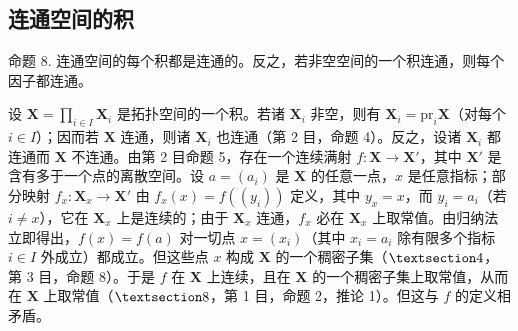 \subsection{连通空间的积}

命题 8. 连通空间的每个积都是连通的。反之，若非空空间的一个积连通，则每个因子都连通。

设 \(\mathbf{X} = \prod_{i \in I} \mathbf{X}_i\) 是拓扑空间的一个积。若诸 \(\mathbf{X}_i\) 非空，则有 \(\mathbf{X}_i = \text{pr}_i\mathbf{X}\)（对每个 \(i \in I\)）；因而若 \(\mathbf{X}\) 连通，则诸 \(\mathbf{X}_i\) 也连通（第 2 目，命题 4）。反之，设诸 \(\mathbf{X}_i\) 都连通而 \(\mathbf{X}\) 不连通。由第 2 目命题 5，存在一个连续满射 \(f: \mathbf{X} \to \mathbf{X}'\)，其中 \(\mathbf{X}'\) 是含有多于一个点的离散空间。设 \(a = (a_i)\) 是 \(\mathbf{X}\) 的任意一点，\(x\) 是任意指标；部分映射 \(f_x: \mathbf{X}_x \to \mathbf{X}'\) 由 \(f_x(x) = f((y_i))\) 定义，其中 \(y_x = x\)，而 \(y_i = a_i\)（若 \(i \neq x\)），它在 \(\mathbf{X}_x\) 上是连续的；由于 \(\mathbf{X}_x\) 连通，\(f_x\) 必在 \(\mathbf{X}_x\) 上取常值。由归纳法立即得出，\(f(x) = f(a)\) 对一切点 \(x = (x_i)\)（其中 \(x_i = a_i\) 除有限多个指标 \(i \in I\) 外成立）都成立。但这些点 \(x\) 构成 \(\mathbf{X}\) 的一个稠密子集（\(\S 4\)，第 3 目，命题 8）。于是 \(f\) 在 \(\mathbf{X}\) 上连续，且在 \(\mathbf{X}\) 的一个稠密子集上取常值，从而在 \(\mathbf{X}\) 上取常值（\(\S 8\)，第 1 目，命题 2，推论 1）。但这与 \(f\) 的定义相矛盾。

